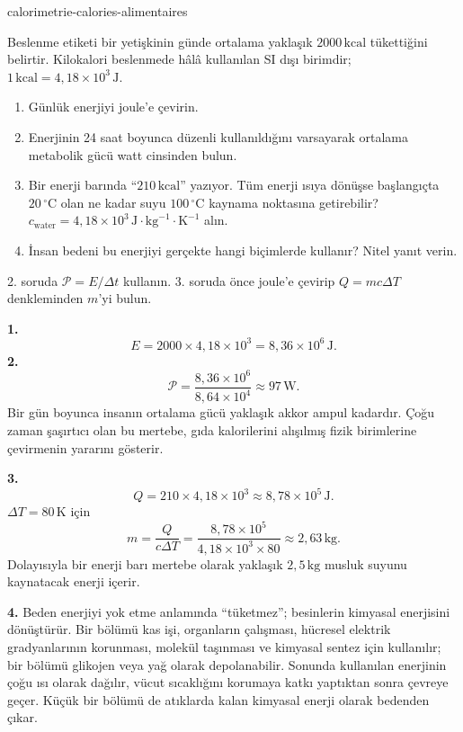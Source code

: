 \begin{exo}{calorimetrie-calories-alimentaires}

Beslenme etiketi bir yetişkinin günde ortalama yaklaşık $2000\,\text{kcal}$ tükettiğini belirtir. Kilokalori beslenmede hâlâ kullanılan SI dışı birimdir; $1\,\text{kcal}=4{,}18\times10^3\,\text{J}$.
\begin{enumerate}
  \item Günlük enerjiyi joule'e çevirin.
  \item Enerjinin 24 saat boyunca düzenli kullanıldığını varsayarak ortalama metabolik gücü watt cinsinden bulun.
  \item Bir enerji barında ``$210\,\text{kcal}$'' yazıyor. Tüm enerji ısıya dönüşse başlangıçta $20\,^\circ\text{C}$ olan ne kadar suyu $100\,^\circ\text{C}$ kaynama noktasına getirebilir? $c_{\text{water}}=4{,}18\times10^3\,\text{J}\!\cdot\!\text{kg}^{-1}\!\cdot\!\text{K}^{-1}$ alın.
  \item İnsan bedeni bu enerjiyi gerçekte hangi biçimlerde kullanır? Nitel yanıt verin.
\end{enumerate}
\begin{indication}
2. soruda $\mathcal P=E/\Delta t$ kullanın. 3. soruda önce joule'e çevirip $Q=mc\Delta T$ denkleminden $m$'yi bulun.
\end{indication}
\begin{solution}
\textbf{1.}
\[
E=2000\times4{,}18\times10^3=8{,}36\times10^6\,\text{J}.
\]
\textbf{2.}
\[
\mathcal P=\frac{8{,}36\times10^6}{8{,}64\times10^4}\approx97\,\text{W}.
\]
Bir gün boyunca insanın ortalama gücü yaklaşık akkor ampul kadardır. Çoğu zaman şaşırtıcı olan bu mertebe, gıda kalorilerini alışılmış fizik birimlerine çevirmenin yararını gösterir.

\textbf{3.}
\[
Q=210\times4{,}18\times10^3\approx8{,}78\times10^5\,\text{J}.
\]
$\Delta T=80\,\text{K}$ için
\[
m=\frac{Q}{c\Delta T}
=\frac{8{,}78\times10^5}{4{,}18\times10^3\times80}
\approx2{,}63\,\text{kg}.
\]
Dolayısıyla bir enerji barı mertebe olarak yaklaşık $2{,}5\,\text{kg}$ musluk suyunu kaynatacak enerji içerir.

\textbf{4.} Beden enerjiyi yok etme anlamında “tüketmez”; besinlerin kimyasal enerjisini dönüştürür. Bir bölümü kas işi, organların çalışması, hücresel elektrik gradyanlarının korunması, molekül taşınması ve kimyasal sentez için kullanılır; bir bölümü glikojen veya yağ olarak depolanabilir. Sonunda kullanılan enerjinin çoğu ısı olarak dağılır, vücut sıcaklığını korumaya katkı yaptıktan sonra çevreye geçer. Küçük bir bölümü de atıklarda kalan kimyasal enerji olarak bedenden çıkar.
\end{solution}
\end{exo}
